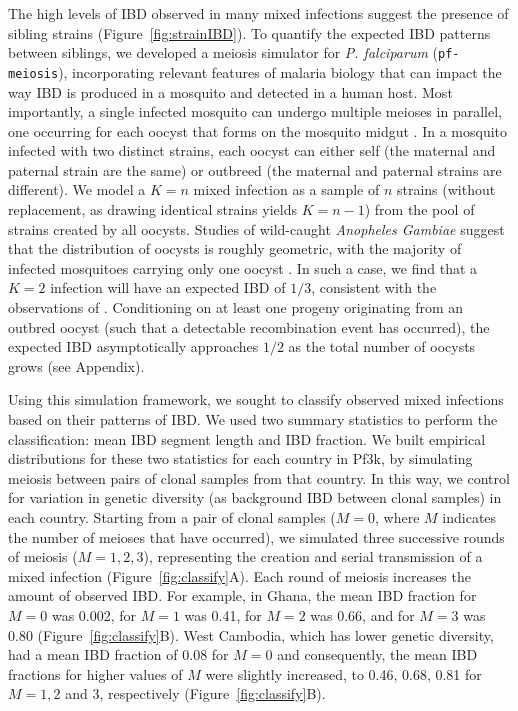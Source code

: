 \documentclass[9pt,lineno]{elife}
\begin{document}
The high levels of IBD observed in many mixed infections suggest the presence of sibling strains (Figure~\ref{fig:strainIBD}). To quantify the expected IBD patterns between siblings, we developed a meiosis simulator for {\it P. falciparum} ({\tt pf-meiosis}), incorporating relevant features of malaria biology that can impact the way IBD is produced in a mosquito and detected in a human host. Most importantly, a single infected mosquito can undergo multiple meioses in parallel, one occurring for each oocyst that forms on the mosquito midgut \citep{Gosh2000}. In a mosquito infected with two distinct strains, each oocyst can either self (the maternal and paternal strain are the same) or outbreed (the maternal and paternal strains are different). We model a $K = n$ mixed infection as a sample of $n$ strains (without replacement, as drawing identical strains yields $K = n-1$) from the pool of strains created by all oocysts. Studies of wild-caught \textit{Anopheles Gambiae} suggest that the distribution of oocysts is roughly geometric, with the majority of infected mosquitoes carrying only one oocyst \citep{Beir1991,Collins1984}. In such a case, we find that a $K=2$ infection will have an expected IBD of $1/3$, consistent with the observations of \citet{Wong2018}.  Conditioning on at least one progeny originating from an outbred oocyst (such that a detectable recombination event has occurred), the expected IBD asymptotically approaches $1/2$ as the total number of oocysts grows (see Appendix).

Using this simulation framework, we sought to classify observed mixed infections based on their patterns of IBD. We used two summary statistics to perform the classification: mean IBD segment length and IBD fraction. We built empirical distributions for these two statistics for each country in Pf3k, by simulating meiosis between pairs of clonal samples from that country.  In this way, we control for variation in genetic diversity (as background IBD between clonal samples) in each country. Starting from a pair of clonal samples ($M=0$, where $M$ indicates the number of meioses that have occurred), we simulated three successive rounds of meiosis ($M=1, 2, 3$), representing the creation and serial transmission of a mixed infection (Figure~\ref{fig:classify}A). Each round of meiosis increases the amount of observed IBD. For example, in Ghana, the mean IBD fraction for $M=0$ was 0.002, for $M=1$ was 0.41, for $M=2$ was 0.66, and for $M=3$ was 0.80 (Figure~\ref{fig:classify}B). West Cambodia, which has lower genetic diversity, had a mean IBD fraction of 0.08 for $M=0$ and consequently, the mean IBD fractions for higher values of $M$ were slightly increased, to 0.46, 0.68, 0.81 for $M=1, 2$ and $3$, respectively (Figure~\ref{fig:classify}B).
\end{document}
